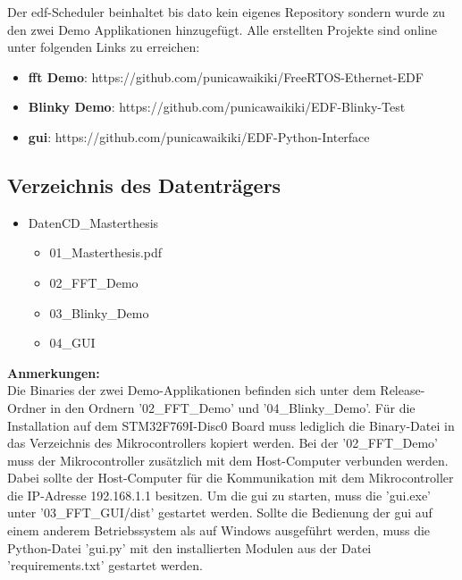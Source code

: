 \documentclass[../EDF Master Thesis.tex]{subfiles}
\begin{document}
Der \ac{edf}-Scheduler beinhaltet bis dato kein eigenes Repository sondern wurde zu den zwei Demo Applikationen hinzugefügt.
Alle erstellten Projekte sind online unter folgenden Links zu erreichen:

\begin{itemize}
    \item \textbf{\ac{fft} Demo}: https://github.com/punicawaikiki/FreeRTOS-Ethernet-EDF
    \item \textbf{Blinky Demo}: https://github.com/punicawaikiki/EDF-Blinky-Test
    \item \textbf{\ac{gui}}: https://github.com/punicawaikiki/EDF-Python-Interface
\end{itemize}

\subsection{Verzeichnis des Datenträgers}

\begin{itemize}
    \item Daten\-CD\_Masterthesis
    \begin{itemize}
        \item 01\_Masterthesis.pdf
        \item 02\_FFT\_Demo
        \item 03\_Blinky\_Demo
        \item 04\_GUI
    \end{itemize}
\end{itemize}

\textbf{Anmerkungen:}\\
Die Binaries der zwei Demo-Applikationen befinden sich unter dem Release-Ordner in den Ordnern '02\_FFT\_Demo' und '04\_Blinky\_Demo'.
Für die Installation auf dem STM32F769I-Disc0 Board muss lediglich die Binary-Datei in das Verzeichnis des Mikrocontrollers kopiert werden.
Bei der '02\_FFT\_Demo' muss der Mikrocontroller zusätzlich mit dem Host-Computer verbunden werden.
Dabei sollte der Host-Computer für die Kommunikation mit dem Mikrocontroller die IP-Adresse 192.168.1.1 besitzen.
Um die \ac{gui} zu starten, muss die 'gui.exe' unter '03\_FFT\_GUI/dist' gestartet werden.
Sollte die Bedienung der \ac{gui} auf einem anderem Betriebssystem als auf Windows ausgeführt werden, muss die Python-Datei 'gui.py' mit den installierten Modulen aus der Datei 'requirements.txt' gestartet werden.
\end{document}
